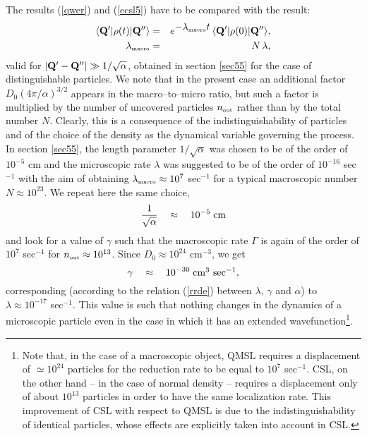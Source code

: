 \documentclass[12pt]{article}
\begin{document}
The results  (\ref{qwer}) and (\ref{ecsl5}) have to be compared
with the result:
\begin{eqnarray}
\langle {\bf Q}'| \rho(t) |{\bf Q}'' \rangle & = &
e^{\displaystyle - \lambda_{\makebox{\tiny macro}} t}\,
\langle {\bf Q}'| \rho(0) |{\bf Q}''\rangle, \\
\lambda_{\makebox{\tiny macro}} & = & N\, \lambda,
\end{eqnarray}
valid for $|{\bf Q}' - {\bf Q}''| \gg 1/\sqrt{\alpha}$, obtained
in section \ref{sec55} for the case of distinguishable particles.
We note that in the present case an additional factor $D_{0} (4\pi
/\alpha)^{3/2}$ appears in the macro--to--micro ratio, but such a
factor is multiplied by the number of uncovered particles
$n_{\makebox{\tiny out}}$ rather than by the total number $N$.
Clearly, this is a consequence of the indistinguishability of
particles and of the choice of the density as the dynamical
variable governing the process. In section \ref{sec55}, the length
parameter $1/\sqrt{\alpha}$ was chosen to be of the order of
$10^{-5}$ cm and the microscopic rate $\lambda$ was suggested to
be of the order of $10^{-16}$ sec$^{-1}$ with the aim of obtaining
$\lambda_{\makebox{\tiny macro}} \approx 10^7$ sec$^{-1}$ for a
typical macroscopic number $N \approx 10^{23}$. We repeat here the
same choice,
\begin{equation} \label{fn1}
\frac{1}{\sqrt{\alpha}} \quad \approx \quad 10^{-5}\; \makebox{cm}
\end{equation}
and look for a value of $\gamma$ such that the macroscopic rate
$\Gamma$ is again of the order of $10^7$ sec$^{-1}$ for
$n_{\makebox{\tiny out}} \approx 10^{13}$. Since $D_{0} \approx
10^{24}$ cm$^{-3}$, we get
\begin{equation} \label{fn2}
\gamma \quad \approx \quad 10^{-30}\; \makebox{cm$^3$ sec$^{-1}$},
\end{equation}
corresponding (according to the relation (\ref{rrde}) between
$\lambda$, $\gamma$ and $\alpha$) to $\lambda \approx 10^{-17}$
sec$^{-1}$. This value is such that nothing changes in the
dynamics of a microscopic particle even in the case in which it
has an extended wavefunction\footnote{Note that, in the case of a
macroscopic object, QMSL requires a displacement of $\simeq
10^{24}$ particles for the reduction rate to be equal to $10^{7}$
sec${}^{-1}$. CSL, on the other hand -- in the case of normal
density -- requires a displacement only of about $10^{13}$ particles in
order to have the same localization rate. This improvement of CSL with
respect to QMSL is due to the indistinguishability of identical
particles, whose effects are explicitly taken into account in CSL.}.
\end{document}
